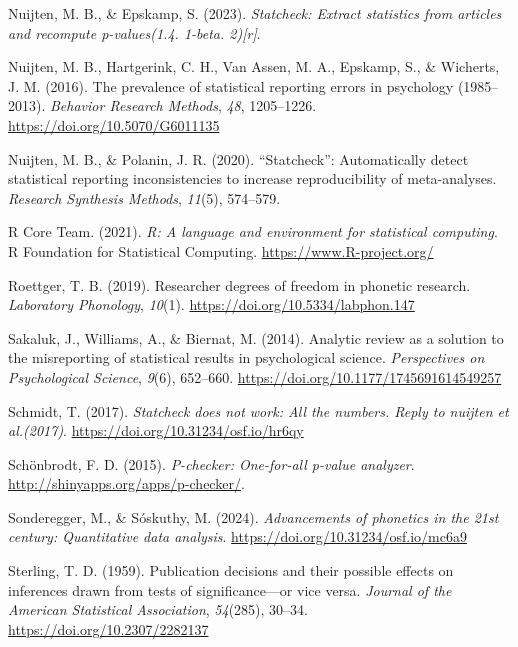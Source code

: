 \documentclass[
  doc,
  longtable,
  nolmodern,
  notxfonts,
  notimes,
  colorlinks=true,linkcolor=blue,citecolor=blue,urlcolor=blue]{apa7}
\newlength{\cslhangindent}
\newenvironment{CSLReferences}[2] %
 {\begin{list}{}{%
  \setlength{\itemindent}{0pt}
  \setlength{\leftmargin}{0pt}
  \setlength{\parsep}{0pt}
  \ifodd #1
   \setlength{\leftmargin}{\cslhangindent}
   \setlength{\itemindent}{-1\cslhangindent}
  \fi
  \setlength{\itemsep}{#2\baselineskip}}}
 {\end{list}}
\begin{document}
\begin{CSLReferences}{1}{0}
Nuijten, M. B., \& Epskamp, S. (2023). \emph{Statcheck: Extract
statistics from articles and recompute p-values(1.4. 1-beta. 2){[}r{]}}.

Nuijten, M. B., Hartgerink, C. H., Van Assen, M. A., Epskamp, S., \&
Wicherts, J. M. (2016). The prevalence of statistical reporting errors
in psychology (1985--2013). \emph{Behavior Research Methods}, \emph{48},
1205--1226. \url{https://doi.org/10.5070/G6011135}

Nuijten, M. B., \& Polanin, J. R. (2020). {``Statcheck''}: Automatically
detect statistical reporting inconsistencies to increase reproducibility
of meta-analyses. \emph{Research Synthesis Methods}, \emph{11}(5),
574--579.

R Core Team. (2021). \emph{R: A language and environment for statistical
computing}. R Foundation for Statistical Computing.
\url{https://www.R-project.org/}

Roettger, T. B. (2019). Researcher degrees of freedom in phonetic
research. \emph{Laboratory Phonology}, \emph{10}(1).
\url{https://doi.org/10.5334/labphon.147}

Sakaluk, J., Williams, A., \& Biernat, M. (2014). Analytic review as a
solution to the misreporting of statistical results in psychological
science. \emph{Perspectives on Psychological Science}, \emph{9}(6),
652--660. \url{https://doi.org/10.1177/1745691614549257}

Schmidt, T. (2017). \emph{Statcheck does not work: All the numbers.
Reply to nuijten et al.(2017)}.
\url{https://doi.org/10.31234/osf.io/hr6qy}

Schönbrodt, F. D. (2015). \emph{P-checker: One-for-all p-value
analyzer}. \url{http://shinyapps.org/apps/p-checker/}.

Sonderegger, M., \& Sóskuthy, M. (2024). \emph{Advancements of phonetics
in the 21st century: Quantitative data analysis}.
\url{https://doi.org/10.31234/osf.io/mc6a9}

Sterling, T. D. (1959). Publication decisions and their possible effects
on inferences drawn from tests of significance---or vice versa.
\emph{Journal of the American Statistical Association}, \emph{54}(285),
30--34. \url{https://doi.org/10.2307/2282137}


\end{CSLReferences}
\end{document}
